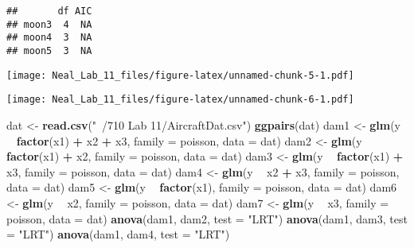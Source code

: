 \documentclass[]{article}
\newenvironment{Shaded}{\begin{snugshade}}{\end{snugshade}}
\newcommand{\KeywordTok}[1]{\textcolor[rgb]{0.13,0.29,0.53}{\textbf{#1}}}
\newcommand{\DataTypeTok}[1]{\textcolor[rgb]{0.13,0.29,0.53}{#1}}
\newcommand{\StringTok}[1]{\textcolor[rgb]{0.31,0.60,0.02}{#1}}
\newcommand{\OperatorTok}[1]{\textcolor[rgb]{0.81,0.36,0.00}{\textbf{#1}}}
\newcommand{\NormalTok}[1]{#1}
\begin{document}
\begin{verbatim}
##       df AIC
## moon3  4  NA
## moon4  3  NA
## moon5  3  NA
\end{verbatim}

\texttt{[image: Neal\_Lab\_11\_files/figure-latex/unnamed-chunk-5-1.pdf]}

\texttt{[image: Neal\_Lab\_11\_files/figure-latex/unnamed-chunk-6-1.pdf]}

\begin{Shaded}
\begin{Highlighting}[]
\NormalTok{dat <-}\StringTok{ }\KeywordTok{read.csv}\NormalTok{(}\StringTok{"~/710 Lab 11/AircraftDat.csv"}\NormalTok{)}
\KeywordTok{ggpairs}\NormalTok{(dat)}
\NormalTok{dam1 <-}\StringTok{ }\KeywordTok{glm}\NormalTok{(y }\OperatorTok{~}\StringTok{ }\KeywordTok{factor}\NormalTok{(x1) }\OperatorTok{+}\StringTok{ }\NormalTok{x2 }\OperatorTok{+}\StringTok{ }\NormalTok{x3, }\DataTypeTok{family =}\NormalTok{ poisson, }\DataTypeTok{data =}\NormalTok{ dat)}
\NormalTok{dam2 <-}\StringTok{ }\KeywordTok{glm}\NormalTok{(y }\OperatorTok{~}\StringTok{ }\KeywordTok{factor}\NormalTok{(x1) }\OperatorTok{+}\StringTok{ }\NormalTok{x2, }\DataTypeTok{family =}\NormalTok{ poisson, }\DataTypeTok{data =}\NormalTok{ dat)}
\NormalTok{dam3 <-}\StringTok{ }\KeywordTok{glm}\NormalTok{(y }\OperatorTok{~}\StringTok{ }\KeywordTok{factor}\NormalTok{(x1) }\OperatorTok{+}\StringTok{ }\NormalTok{x3, }\DataTypeTok{family =}\NormalTok{ poisson, }\DataTypeTok{data =}\NormalTok{ dat)}
\NormalTok{dam4 <-}\StringTok{ }\KeywordTok{glm}\NormalTok{(y }\OperatorTok{~}\StringTok{ }\NormalTok{x2 }\OperatorTok{+}\StringTok{ }\NormalTok{x3, }\DataTypeTok{family =}\NormalTok{ poisson, }\DataTypeTok{data =}\NormalTok{ dat)}
\NormalTok{dam5 <-}\StringTok{ }\KeywordTok{glm}\NormalTok{(y }\OperatorTok{~}\StringTok{ }\KeywordTok{factor}\NormalTok{(x1), }\DataTypeTok{family =}\NormalTok{ poisson, }\DataTypeTok{data =}\NormalTok{ dat)}
\NormalTok{dam6 <-}\StringTok{ }\KeywordTok{glm}\NormalTok{(y }\OperatorTok{~}\StringTok{ }\NormalTok{x2, }\DataTypeTok{family =}\NormalTok{ poisson, }\DataTypeTok{data =}\NormalTok{ dat)}
\NormalTok{dam7 <-}\StringTok{ }\KeywordTok{glm}\NormalTok{(y }\OperatorTok{~}\StringTok{ }\NormalTok{x3, }\DataTypeTok{family =}\NormalTok{ poisson, }\DataTypeTok{data =}\NormalTok{ dat)}
\KeywordTok{anova}\NormalTok{(dam1, dam2, }\DataTypeTok{test =} \StringTok{"LRT"}\NormalTok{)}
\KeywordTok{anova}\NormalTok{(dam1, dam3, }\DataTypeTok{test =} \StringTok{"LRT"}\NormalTok{)}
\KeywordTok{anova}\NormalTok{(dam1, dam4, }\DataTypeTok{test =} \StringTok{"LRT"}\NormalTok{)}

\end{Highlighting}
\end{Shaded}
\end{document}
